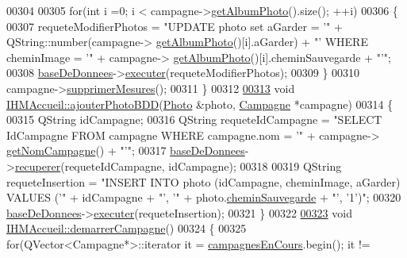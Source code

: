 \begin{DoxyCode}
{00304 
00305     \textcolor{keywordflow}{for}(\textcolor{keywordtype}{int} i =0; i < campagne->\hyperlink{class_campagne_abec90fcbc0c4ded45caaac9adb454add}{getAlbumPhoto}().size(); ++i)
00306     \{
00307         requeteModifierPhotos = \textcolor{stringliteral}{"UPDATE photo set aGarder = '"} + QString::number(campagne->
      \hyperlink{class_campagne_abec90fcbc0c4ded45caaac9adb454add}{getAlbumPhoto}()[i].aGarder) + \textcolor{stringliteral}{"' WHERE cheminImage = '"} + campagne->
      \hyperlink{class_campagne_abec90fcbc0c4ded45caaac9adb454add}{getAlbumPhoto}()[i].cheminSauvegarde + \textcolor{stringliteral}{"'"};
00308         \hyperlink{class_i_h_m_accueil_ab56d9846c071396a92f88272880e2c1f}{baseDeDonnees}->\hyperlink{class_base_de_donnees_aa8de5f8f8bb17edc43f5c0ee33712081}{executer}(requeteModifierPhotos);
00309     \}
00310     campagne->\hyperlink{class_campagne_a77066423e53f99bb6cd39fd25a6f2b5f}{supprimerMesures}();
00311 \}
00312 
\hyperlink{class_i_h_m_accueil_aa27c7334efe44c8c4cd582df6581fdff}{00313} \textcolor{keywordtype}{void} \hyperlink{class_i_h_m_accueil_aa27c7334efe44c8c4cd582df6581fdff}{IHMAccueil::ajouterPhotoBDD}(\hyperlink{struct_photo}{Photo} &photo, 
      \hyperlink{class_campagne}{Campagne} *campagne)
00314 \{
00315     QString idCampagne;
00316     QString requeteIdCampagne = \textcolor{stringliteral}{"SELECT IdCampagne FROM campagne WHERE campagne.nom = '"} + campagne->
      \hyperlink{class_campagne_a99a682fcb8e5a3f8c2aff7a44eb2c930}{getNomCampagne}() + \textcolor{stringliteral}{"'"};
00317     \hyperlink{class_i_h_m_accueil_ab56d9846c071396a92f88272880e2c1f}{baseDeDonnees}->\hyperlink{class_base_de_donnees_a77539baad389f5acf754cd2cd452403e}{recuperer}(requeteIdCampagne, idCampagne);
00318 
00319     QString requeteInsertion = \textcolor{stringliteral}{"INSERT INTO photo (idCampagne, cheminImage, aGarder) VALUES ('"} + 
      idCampagne + \textcolor{stringliteral}{"', '"} + photo.\hyperlink{struct_photo_a3c28eb9ad160b65deb46a72146a1d14f}{cheminSauvegarde} + \textcolor{stringliteral}{"', '1')"};
00320     \hyperlink{class_i_h_m_accueil_ab56d9846c071396a92f88272880e2c1f}{baseDeDonnees}->\hyperlink{class_base_de_donnees_aa8de5f8f8bb17edc43f5c0ee33712081}{executer}(requeteInsertion);
00321 \}
00322 
\hyperlink{class_i_h_m_accueil_a6e8935ff4e0ba8f0c0015f370d91eda3}{00323} \textcolor{keywordtype}{void} \hyperlink{class_i_h_m_accueil_a6e8935ff4e0ba8f0c0015f370d91eda3}{IHMAccueil::demarrerCampagne}()
00324 \{
00325     \textcolor{keywordflow}{for}(QVector<Campagne*>::iterator it = \hyperlink{class_i_h_m_accueil_ad3827b81480eb201b5927c16a2ad1c46}{campagnesEnCours}.begin(); it != 
}
\end{DoxyCode}
